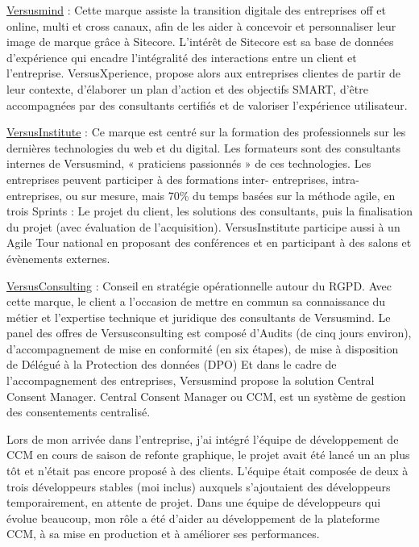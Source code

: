 \documentclass[12pt, a4paper]{report}
\begin{document}
\underline{Versusmind} : Cette marque assiste la transition digitale des entreprises off et online, multi et
cross canaux, afin de les aider à concevoir et personnaliser leur image de marque grâce à Sitecore.
L’intérêt de Sitecore est sa base de données d’expérience qui encadre l’intégralité des interactions
entre un client et l’entreprise. VersusXperience, propose alors aux entreprises clientes de partir de leur
contexte, d’élaborer un plan d’action et des objectifs SMART, d’être accompagnées par des consultants
certifiés et de valoriser l’expérience utilisateur.\newline

\underline{VersusInstitute} : Ce marque est centré sur la formation des professionnels sur les dernières
technologies du web et du digital. Les formateurs sont des consultants internes de Versusmind,
« praticiens passionnés » de ces technologies. Les entreprises peuvent participer à des formations inter-
entreprises, intra-entreprises, ou sur mesure, mais 70\% du temps basées sur la méthode agile, en trois
Sprints : Le projet du client, les solutions des consultants, puis la finalisation du projet (avec évaluation
de l’acquisition). VersusInstitute participe aussi à un Agile Tour national en proposant des conférences
et en participant à des salons et évènements externes.\newline

\underline{VersusConsulting} : Conseil en stratégie opérationnelle autour du
RGPD. Avec cette marque, le client a l’occasion de mettre en commun sa connaissance du métier et
l’expertise technique et juridique des consultants de Versusmind. Le panel des offres de
Versusconsulting est composé d’Audits (de cinq jours environ), d’accompagnement de mise en
conformité (en six étapes), de mise à disposition de Délégué à la Protection des données (DPO)\newline
Et dans le cadre de l'accompagnement des entreprises, Versusmind propose la solution Central Consent Manager.
Central Consent Manager ou CCM, est un système de gestion des consentements centralisé.\newline

Lors de mon arrivée dans l’entreprise, j’ai intégré l’équipe de développement de CCM en cours de
saison de refonte graphique, le projet avait été lancé un an plus tôt et n’était pas encore proposé à des
clients. L’équipe était composée de deux à trois développeurs stables (moi inclus) auxquels s’ajoutaient
des développeurs temporairement, en attente de projet.\newline
Dans une équipe de développeurs qui évolue beaucoup, mon rôle a été d'aider au développement de la plateforme CCM, à sa mise en production et à améliorer ses performances.
\end{document}
